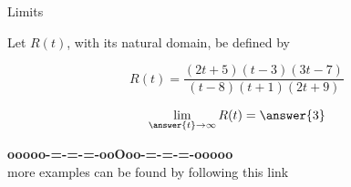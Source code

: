\documentclass{ximera}
\begin{document}
\begin{example} Limits 



Let $R(t)$, with its natural domain, be defined by 



\[
  R(t) = \frac{(2t+5)(t-3)(3t-7)}{(t-8)(t+1)(2t+9)} 
\]





\[   \lim_{\answer{t} \to \infty} R(t)   = \answer{3}     \]






\end{example}













\begin{center}
\textbf{\textcolor{green!50!black}{ooooo-=-=-=-ooOoo-=-=-=-ooooo}} \\

more examples can be found by following this link\\ 

\end{center}
\end{document}
